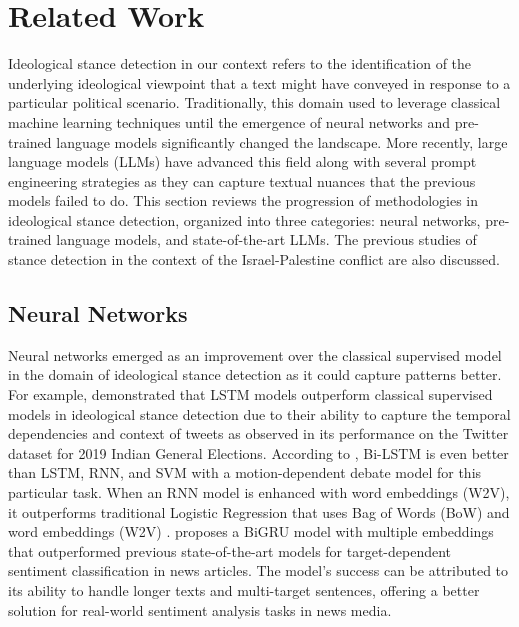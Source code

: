 \section{Related Work}
\label{rw}
Ideological stance detection in our context refers to the identification of the underlying ideological viewpoint that a text might have conveyed in response to a particular political scenario. Traditionally, this domain used to leverage classical machine learning techniques until the emergence of neural networks and pre-trained language models significantly changed the landscape. More recently, large language models (LLMs) have advanced this field along with several prompt engineering strategies as they can capture textual nuances that the previous models failed to do. This section reviews the progression of methodologies in ideological stance detection, organized into three categories: neural networks, pre-trained language models, and state-of-the-art LLMs. The previous studies of stance detection in the context of the Israel-Palestine conflict are also discussed. 

\subsection*{\textbf{Neural Networks}}
Neural networks emerged as an improvement over the classical supervised model in the domain of ideological stance detection as it could capture patterns better. For example, \citep{ansari2020analysis} demonstrated that LSTM models outperform classical supervised models in ideological stance detection due to their ability to capture the temporal dependencies and context of tweets as observed in its performance on the Twitter dataset for 2019 Indian General Elections. According to \citep{khatua2020predicting}, Bi-LSTM is even better than LSTM, RNN, and SVM with a motion-dependent debate model for this particular task. When an RNN model is enhanced with word embeddings (W2V), it outperforms traditional Logistic Regression that uses Bag of Words (BoW) and word embeddings (W2V) \citep{iyyer2014political}. \citep{hamborg2021news} proposes a BiGRU model with multiple embeddings that outperformed previous state-of-the-art models for target-dependent sentiment classification in news articles. The model's success can be attributed to its ability to handle longer texts and multi-target sentences, offering a better solution for real-world sentiment analysis tasks in news media.

